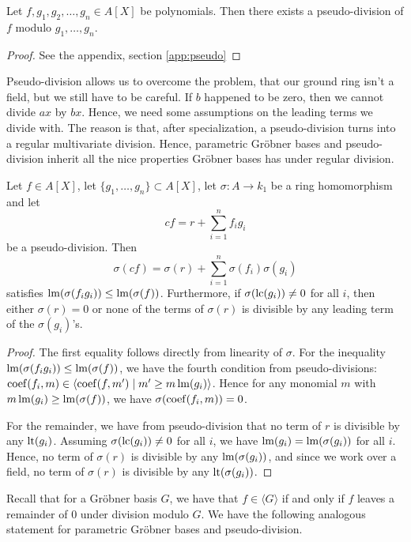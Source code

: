 \begin{theorem}\label{thm:exi_pseudo}
  Let $f, g_{1}, g_{2}, \dots, g_{n} \in A[X]$ be polynomials. Then there exists a pseudo-division of $f$ modulo $g_{1}, \dots, g_{n}$.
\end{theorem}
\begin{proof}
  See the appendix, section \ref{app:pseudo}
\end{proof}

Pseudo-division allows us to overcome the problem, that our ground ring isn't a field, but we still have to be careful. If $b$ happened to be zero, then we cannot divide $ax$ by $bx$. Hence, we need some assumptions on the leading terms we divide with. The reason is that, after specialization, a pseudo-division turns into a regular multivariate division. Hence, parametric Gröbner bases and pseudo-division inherit all the nice properties Gröbner bases has under regular division.

\begin{lemma}\label{lem:ps_div_to_div}
  Let $f \in A[X]$, let $\{g_{1}, \dots, g_{n}\} \subset A[X]$, let $\sigma : A \to k_{1}$ be a ring homomorphism and let
  \[cf = r + \sum_{i=1}^{n}f_{i}g_{i}\]
  be a pseudo-division. Then
  \[\sigma(cf) = \sigma(r) + \sum_{i=1}^{n} \sigma(f_{i})\sigma(g_{i})\]
  satisfies $\operatorname{lm}(\sigma(f_{i} g_{i})) \leq \operatorname{lm}(\sigma(f))$. Furthermore, if $\sigma(\operatorname{lc}(g_{i})) \neq 0$ for all $i$, then either $\sigma(r) = 0$ or none of the terms of $\sigma(r)$ is divisible by any leading term of the $\sigma(g_{i})$'s.
\end{lemma}
\begin{proof}
  The first equality follows directly from linearity of $\sigma$. For the inequality $\operatorname{lm}(\sigma(f_{i} g_{i})) \leq \operatorname{lm}(\sigma(f))$, we have the fourth condition from pseudo-divisions: $\operatorname{coef}(f_{i}, m) \in \langle \operatorname{coef}(f, m') \mid m' \geq m \operatorname{lm}(g_{i}) \rangle$. Hence for any monomial $m$ with $m\operatorname{lm}(g_{i}) \geq \operatorname{lm}(\sigma(f))$, we have $\sigma(\operatorname{coef}(f_{i}, m)) = 0$.

  For the remainder, we have from pseudo-division that no term of $r$ is divisible by any $\operatorname{lt}(g_{i})$. Assuming $\sigma(\operatorname{lc}(g_{i})) \neq 0$ for all $i$, we have $\operatorname{lm}(g_{i}) = \operatorname{lm}(\sigma(g_{i}))$ for all $i$. Hence, no term of $\sigma(r)$ is divisible by any $\operatorname{lm}(\sigma(g_{i}))$, and since we work over a field, no term of $\sigma(r)$ is divisible by any $\operatorname{lt}(\sigma(g_{i}))$.
\end{proof}

Recall that for a Gröbner basis $G$, we have that $f \in \langle G \rangle$ if and only if $f$ leaves a remainder of $0$ under division modulo $G$. We have the following analogous statement for parametric Gröbner bases and pseudo-division.


